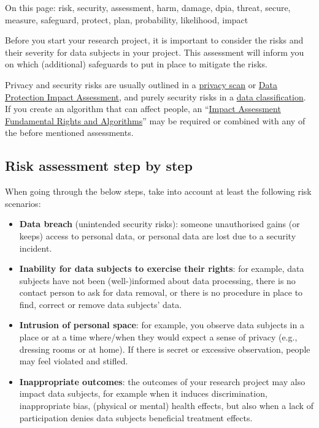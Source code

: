 \documentclass[
]{book}
\providecommand{\tightlist}{%
  \setlength{\itemsep}{0pt}\setlength{\parskip}{0pt}}
\begin{document}
On this page: risk, security, assessment, harm, damage, dpia, threat, secure,
measure, safeguard, protect, plan, probability, likelihood, impact

Before you start your research project, it is important to consider the risks
and their severity for data subjects in your project. This assessment will
inform you on which (additional) safeguards to put in place to mitigate the
risks.

Privacy and security risks are usually outlined in a
\protect\hyperlink{privacy-scan}{privacy scan} or \protect\hyperlink{dpia}{Data Protection Impact Assessment}, and
purely security risks in a \protect\hyperlink{data-classification}{data classification}. If you
create an algorithm that can affect people, an
``\href{https://dspace.library.uu.nl/handle/1874/420552}{Impact Assessment Fundamental Rights and Algorithms}''
may be required or combined with any of the before mentioned assessments.

\hypertarget{risk-assessment-steps}{%
\subsection{Risk assessment step by step}\label{risk-assessment-steps}}

When going through the below steps, take into account at least the following
risk scenarios:

\begin{itemize}
\tightlist
\item
  \textbf{Data breach} (unintended security risks): someone unauthorised gains (or
  keeps) access to personal data, or personal data are lost due to a security
  incident.
\item
  \textbf{Inability for data subjects to exercise their rights}: for example, data
  subjects have not been (well-)informed about data processing, there is no
  contact person to ask for data removal, or there is no procedure in place to
  find, correct or remove data subjects' data.
\item
  \textbf{Intrusion of personal space}: for example, you observe data subjects in a
  place or at a time where/when they would expect a sense of privacy (e.g.,
  dressing rooms or at home). If there is secret or excessive observation, people
  may feel violated and stifled.
\item
  \textbf{Inappropriate outcomes}: the outcomes of your research project may also
  impact data subjects, for example when it induces discrimination, inappropriate
  bias, (physical or mental) health effects, but also when a lack of participation
  denies data subjects beneficial treatment effects.
\end{itemize}
\end{document}
